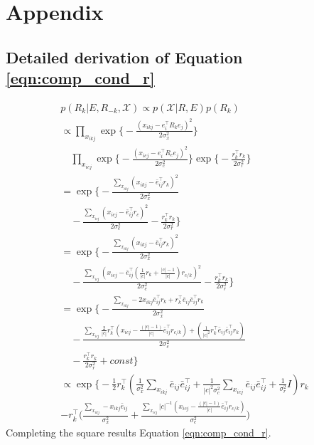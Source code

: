 \documentclass{article}
\begin{document}




\section*{Appendix}
\subsection*{Detailed derivation of Equation \ref{eqn:comp_cond_r}}

\begin{align*}
&p(R_k | E, R_{-k}, \mathcal{X}) \propto p(\mathcal{X} | R, E)p(R_k)&\\
&\propto \prod_{x_{ikj}}\exp\bigg\{-\frac{(x_{ikj} - e_i^\top R_k e_j)^2}{2\sigma_x^2}\bigg\} &\\
& \quad\prod_{x_{icj}} \exp\bigg\{-\frac{(x_{icj} - e_i^\top R_c e_j)^2}{2\sigma_c^2}\bigg\} \exp\bigg\{-\frac{r_k^\top r_k}{2\sigma_r^2}\bigg\}&\\
&= \exp\bigg\{-\frac{\sum_{x_{ikj}}(x_{ikj} - \bar{e}_{ij}^\top r_k)^2}{2\sigma_x^2} &\\
&\quad- \frac{\sum_{x_{icj}}(x_{icj} - \bar{e}_{ij}^\top r_c)^2}{2\sigma_c^2} -\frac{r_k^\top r_k}{2\sigma_r^2} \bigg\}&\\
&= \exp\bigg\{-\frac{\sum_{x_{ikj}}(x_{ikj} - \bar{e}_{ij}^\top r_k)^2}{2\sigma_x^2} &\\ 
&\quad-\frac{\sum_{x_{icj}}(x_{icj} - \bar{e}_{ij}^\top (\frac{1}{|c|}r_k + \frac{|c|-1}{|c|})r_{c/k})^2}{2\sigma_c^2} -\frac{r_k^\top r_k}{2\sigma_r^2} \bigg\}&\\
&= \exp\bigg\{ -\frac{\sum_{x_{ikj}}- 2 x_{ikj} \bar{e}_{ij}^\top r_k + r_k^\top \bar{e}_{ij} \bar{e}_{ij}^\top r_k }{2\sigma_x^2} &\\
&\quad-\frac{\sum_{x_{icj}} \frac{2}{|c|} r_k ^\top (x_{icj} - \frac{(|c|-1)}{|c|} \bar{e}_{ij}^\top r_{c/k}) + (\frac{1}{|c|^2}r_k^\top \bar{e}_{ij} \bar{e}_{ij}^\top r_k)}{2\sigma_c^2} &\\
&\quad-\frac{r_k^\top r_k}{2\sigma_r^2} + const \bigg\}&\\
&\propto \exp\bigg\{ - \frac{1}{2}r_k^\top(\frac{1}{\sigma_x^2}\sum_{x_{ikj}} \bar{e}_{ij}\bar{e}_{ij}^\top + \frac{1}{|c|^2\sigma_c^2}\sum_{x_{icj}} \bar{e}_{ij}\bar{e}_{ij}^\top + \frac{1}{\sigma_r^2}I) r_k  &\\
&- r_k^\top \Big(\frac{\sum_{x_{ikj}}-x_{ikj}\bar{e}_{ij}}{\sigma_x^2} + \frac{\sum_{x_{icj}} |c|^{-1} (x_{icj} - \frac{(|c|-1)}{|c|} \bar{e}_{ij}^\top r_{c/k})}{\sigma_c^2} \Big)&
\end{align*}
Completing the square results Equation \ref{eqn:comp_cond_r}.
\end{document}
